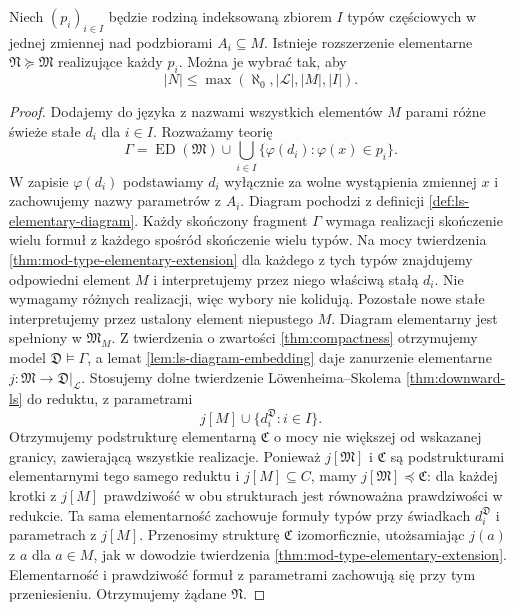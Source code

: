\begin{lemat}
\label{lem:mod-saturation-many-types}
Niech $(p_i)_{i\in I}$ będzie rodziną indeksowaną zbiorem $I$
typów częściowych w jednej zmiennej nad podzbiorami
$A_i\subseteq M$. Istnieje rozszerzenie elementarne
$\mathfrak N\succeq\mathfrak M$ realizujące każdy $p_i$.
Można je wybrać tak, aby
\[
|N|\leq\max(\aleph_0,|\mathcal L|,|M|,|I|).
\]
\end{lemat}
\begin{proof}
Dodajemy do języka z nazwami wszystkich elementów $M$
parami różne świeże stałe $d_i$ dla $i\in I$.
Rozważamy teorię
\[
\Gamma=\operatorname{ED}(\mathfrak M)
\cup\bigcup_{i\in I}\{\varphi(d_i):\varphi(x)\in p_i\}.
\]
W zapisie $\varphi(d_i)$ podstawiamy $d_i$ wyłącznie
za wolne wystąpienia zmiennej $x$ i zachowujemy nazwy
parametrów z $A_i$. Diagram pochodzi z definicji
\ref{def:ls-elementary-diagram}. Każdy skończony fragment $\Gamma$ wymaga
realizacji skończenie wielu formuł z każdego spośród
skończenie wielu typów. Na mocy twierdzenia
\ref{thm:mod-type-elementary-extension} dla każdego
z tych typów znajdujemy odpowiedni element $M$
i interpretujemy przez niego właściwą stałą $d_i$.
Nie wymagamy różnych realizacji, więc wybory nie
kolidują. Pozostałe nowe stałe interpretujemy przez
ustalony element niepustego $M$. Diagram elementarny
jest spełniony w $\mathfrak M_M$.
Z twierdzenia o zwartości \ref{thm:compactness} otrzymujemy
model $\mathfrak D\models\Gamma$,
a lemat \ref{lem:ls-diagram-embedding} daje zanurzenie
elementarne $j:\mathfrak M\to\mathfrak D|_{\mathcal L}$.
Stosujemy dolne twierdzenie Löwenheima--Skolema
\ref{thm:downward-ls} do reduktu, z parametrami
\[
j[M]\cup\{d_i^{\mathfrak D}:i\in I\}.
\]
Otrzymujemy podstrukturę elementarną $\mathfrak C$ o mocy
nie większej od wskazanej granicy, zawierającą wszystkie
realizacje. Ponieważ $j[\mathfrak M]$ i $\mathfrak C$ są
podstrukturami elementarnymi tego samego reduktu
i $j[M]\subseteq C$, mamy $j[\mathfrak M]\preccurlyeq\mathfrak C$:
dla każdej krotki z $j[M]$ prawdziwość w obu strukturach
jest równoważna prawdziwości w redukcie. Ta sama
elementarność zachowuje formuły typów przy świadkach
$d_i^{\mathfrak D}$ i parametrach z $j[M]$.
Przenosimy strukturę $\mathfrak C$ izomorficznie,
utożsamiając $j(a)$ z $a$
dla $a\in M$, jak w dowodzie twierdzenia
\ref{thm:mod-type-elementary-extension}. Elementarność
i prawdziwość formuł z parametrami zachowują się przy
tym przeniesieniu. Otrzymujemy żądane $\mathfrak N$.
\end{proof}

